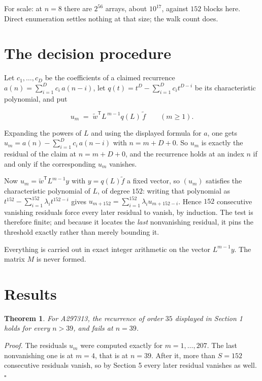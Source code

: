 \documentclass[11pt]{article}
\newtheorem{theorem}{Theorem}
\theoremstyle{definition}
\begin{document}
For scale: at $n = 8$ there are $2^{56}$ arrays, about $10^{17}$, against $152$ blocks here. Direct enumeration settles nothing at that size; the walk count does.

\section{The decision procedure}

Let $c_1,\dots,c_D$ be the coefficients of a claimed recurrence $a(n) = \sum_{i=1}^{D} c_i\,a(n-i)$, let $q(t) = t^{D} - \sum_{i=1}^{D} c_i t^{D-i}$ be its characteristic polynomial, and put

\[u_m \;=\; \tilde w^{\mathsf T} L^{\,m-1} q(L)\,\tilde f \qquad (m \ge 1).\]

Expanding the powers of $L$ and using the displayed formula for $a$, one gets $u_m = a(n) - \sum_{i=1}^{D} c_i\,a(n-i)$ with $n = m + D + 0$. So $u_m$ is exactly the residual of the claim at $n = m + D + 0$, and the recurrence holds at an index $n$ if and only if the corresponding $u_m$ vanishes.

Now $u_m = \tilde w^{\mathsf T} L^{m-1} y$ with $y = q(L)\tilde f$ a fixed vector, so $(u_m)$ satisfies the characteristic polynomial of $L$, of degree $152$: writing that polynomial as $t^{152} - \sum_{i=1}^{152} \lambda_i t^{152-i}$ gives $u_{m+152} = \sum_{i=1}^{152} \lambda_i u_{m+152-i}$. Hence $152$ consecutive vanishing residuals force every later residual to vanish, by induction. The test is therefore finite; and because it locates the {\itshape last} nonvanishing residual, it pins the threshold exactly rather than merely bounding it.

Everything is carried out in exact integer arithmetic on the vector $L^{m-1}y$. The matrix $M$ is never formed.

\section{Results}

\begin{theorem} For A297313, the recurrence of order $35$ displayed in Section 1 holds for every $n > 39$, and fails at $n = 39$.\end{theorem}

{\itshape Proof.} The residuals $u_m$ were computed exactly for $m = 1,\dots,207$. The last nonvanishing one is at $m = 4$, that is at $n = 39$. After it, more than $S = 152$ consecutive residuals vanish, so by Section 5 every later residual vanishes as well. $\square$
\end{document}
